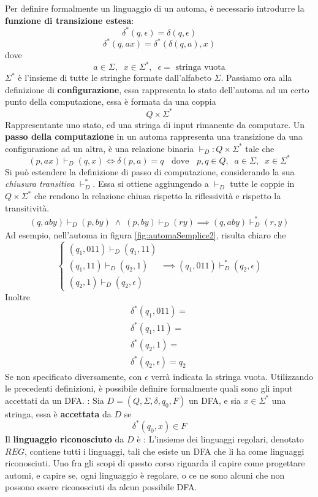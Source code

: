\documentclass[10pt, letterpaper]{report}
\begin{document}
Per definire formalmente un linguaggio di un automa, è 
necessario introdurre la \textbf{funzione di transizione estesa}:
$$ \delta^*(q,\epsilon)=\delta(q,\epsilon)$$
$$\delta^*(q,ax)=\delta^*(\delta(q,a),x)$$
dove
$$ a\in \Sigma,\;\;x\in \Sigma^*,\;\;\epsilon = \text{ stringa vuota}$$
$\Sigma^*$ è l'insieme di tutte le stringhe formate dall'alfabeto 
$\Sigma$. Passiamo ora alla definizione di \textbf{configurazione}, essa 
rappresenta lo stato dell'automa ad un certo punto della 
computazione, essa è formata da una coppia 
$$ Q\times \Sigma^*$$
Rappresentante uno stato, ed una stringa di input rimanente da 
computare.\acc 
Un \textbf{passo della computazione} in un automa rappresenta 
una transizione da una configurazione ad un altra, è una 
relazione binaria $\vdash_D : Q\times \Sigma^*$ tale che 
$$ 
(p,ax)\vdash_D (q,x)\iff \delta(p,a)=q \;\;\text{ dove }\;\;
p,q\in Q,\;\;a\in\Sigma,\;\;x\in\Sigma^*$$
Si può estendere la definizione di passo di computazione, 
considerando la sua \textit{chiusura transitiva} 
$\vdash_D^*$. Essa si ottiene aggiungendo a $\vdash_D$ tutte 
le coppie in $ Q\times \Sigma^*$ che rendono 
la relazione chiusa rispetto la riflessività e rispetto 
la transitività.
$$ \begin{matrix}
    (q,aby)\vdash_D (p,by) \;\land\;  
    (p,by)\vdash_D (ry) \implies 
    (q,aby)\vdash_D^*(r,y)
\end{matrix}$$
Ad esempio, nell'automa in figura \ref{fig:automaSemplice2}, 
risulta chiaro che 
$$\begin{cases}
    (q_1,011)\vdash_D (q_1,11)\\
    (q_1,11) \vdash_D (q_2,1)\\
    (q_2,1) \vdash_D (q_2,\epsilon)
\end{cases} \implies
(q_1,011) \vdash_D^* (q_2,\epsilon)$$
Inoltre$$ \begin{matrix}
    \delta^*(q_1,011) = \\ 
    \delta^*(q_1,11)  = \\ 
    \delta^*(q_2,1) = \\ 
    \delta^*(q_2,\epsilon) = q_2
\end{matrix}$$
Se non specificato diversamente, con $\epsilon$ verrà indicata 
la stringa vuota. Utilizzando le precedenti definizioni, è possibile definire formalmente 
quali sono gli input accettati da un DFA.\acc 
{} : Sia $D=(Q,\Sigma,\delta, q_0, F)$ un DFA, e sia $x\in \Sigma^*$ una stringa, essa 
è \textbf{accettata} da $D$ se $$ \delta^*(q_0,x)\in F$$
Il \textbf{linguaggio riconosciuto} da $D$ è 
 : L'insieme dei linguaggi regolari, denotato $REG$, contiene tutti 
i linguaggi, tali che esiste un DFA che li ha come linguaggi riconosciuti.
Uno fra gli scopi di questo corso riguarda il capire come progettare automi, e capire se, 
ogni linguaggio è regolare, o ce ne sono alcuni che non possono essere riconosciuti da 
alcun possibile DFA. 
\end{document}
